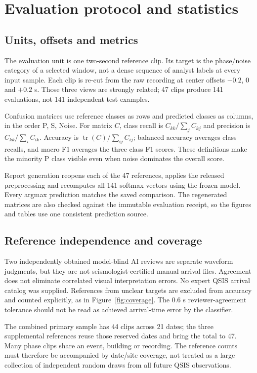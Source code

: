 \documentclass[a4paper,11pt,oneside]{article}
\begin{document}
\section{Evaluation protocol and statistics}
\subsection{Units, offsets and metrics}
The evaluation unit is one two-second reference clip. Its target is the
phase/noise category of a selected window, not a dense sequence of analyst
labels at every input sample. Each clip is re-cut from the raw recording at
center offsets $-0.2$, 0 and $+0.2$ s. Those three views are strongly related;
47 clips produce 141 evaluations, not 141 independent test examples.

Confusion matrices use reference classes as rows and predicted classes as
columns, in the order P, S, Noise. For matrix $C$, class recall is
$C_{kk}/\sum_j C_{kj}$ and precision is $C_{kk}/\sum_i C_{ik}$. Accuracy is
$\operatorname{tr}(C)/\sum_{ij} C_{ij}$; balanced accuracy averages class recalls,
and macro F1 averages the three class F1 scores. These definitions make the
minority P class visible even when noise dominates the overall score.

Report generation reopens each of the 47 references, applies the released
preprocessing and recomputes all 141 softmax vectors using the frozen model.
Every argmax prediction matches the saved comparison. The regenerated
matrices are also checked against the immutable evaluation receipt, so the
figures and tables use one consistent prediction source.

\subsection{Reference independence and coverage}
Two independently obtained model-blind AI reviews are separate waveform
judgments, but they are not seismologist-certified manual arrival files.
Agreement does not eliminate correlated visual interpretation errors. No
expert QSIS arrival catalog was supplied. References from unclear targets
are excluded from accuracy and counted explicitly, as in
Figure~\ref{fig:coverage}. The 0.6 s reviewer-agreement tolerance should not
be read as achieved arrival-time error by the classifier.

The combined primary sample has 44 clips across 21 dates; the three
supplemental references reuse those reserved dates and bring the total to 47.
Many phase clips share an event, building or recording. The reference counts
must therefore be accompanied by date/site coverage, not treated as a large
collection of independent random draws from all future QSIS observations.
\end{document}
